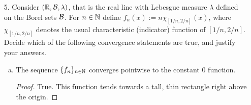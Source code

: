 \begin{itemize}
\begin{enumerate}[(a)]
\begin{proof}
With this, we induct. Suppose that it's true for $n-1$.
\begin{align*}
    S^nT - TS^n &= S^nT - S^{n-1}TS + S^{n-1}TS - STS^{n-1} + STS^{n-1} - TS^n \\ 
    &= S^{n-1}(ST - TS) + S(S^{n-2}T - TS^{n-2})S + (ST - TS)S^{n-1} \\
    &= 2S^{n-1}(ST - TS) + S((n-2) S^{n-3}(ST - TS))S \\ 
    &= 2S^{n-1}(ST - TS) + (n-2) S^{n-1}(ST - TS) \\ 
    &= n S^{n-1}(ST - TS)
\end{align*}
\end{proof}

\item Show that there does not exist bounded linear operators $S, T : X \rightarrow X$ such
that $ST - T S = I$, where $I : X \rightarrow X$ denotes the identity operator.

\textit{In finite dimensions, over $\Mat_n(\bbr)$, this is a simple consequence of the trace function. As an exercise, show that it \textbf{is} possible over $\Mat_n(\bbz_p)$ for prime characteristic. Over infinite dimensions, this is important for quantum mechanical reasons. See Stone-von Neumann theorem.} 

\medskip  

\begin{proof}
By above, $S^nT - TS^n = n S^{n-1}$. Then, by taking norms, 
\begin{align*}
    n||S^{n-1}|| &= ||S^nT - TS^n|| \\
    &\leq ||S^nT|| + ||TS^n|| \\ 
    &\leq ||S^n|| \ ||T|| + ||T|| \ ||S^n|| \\
    &\leq 2||S^{n-1}|| \ ||S|| \ ||T||. 
\end{align*}
Hence $n \leq 2||T|| \ ||S||$ for all $n \in \bbn$. But this is in opposition to the boundedness of $T$ and $S$.
\end{proof}
\end{enumerate}






\item[5.] Consider $(\mathbb{R}, \mathcal{B}, \lambda)$, that is the real line with Lebesgue measure $\lambda$ defined on
the Borel sets $\mathcal{B}$. For $n \in \bbn$ define $f_n(x) := n \chi_{[1/n, 2/n]}(x)$, where $\chi_{[1/n, 2/n]}$ denotes the usual
characteristic (indicator) function of $[1/n, 2/n]$. Decide which of the following convergence
statements are true, and justify your answers.
\begin{enumerate}[(a)]
\item The sequence $\{f_n\}_{n \in \mathbb{N}}$ converges pointwise to the constant $0$ function.
\begin{proof}
True. This function tends towards a tall, thin rectangle right above the origin.
\end{proof}


\end{enumerate}
\end{itemize}
